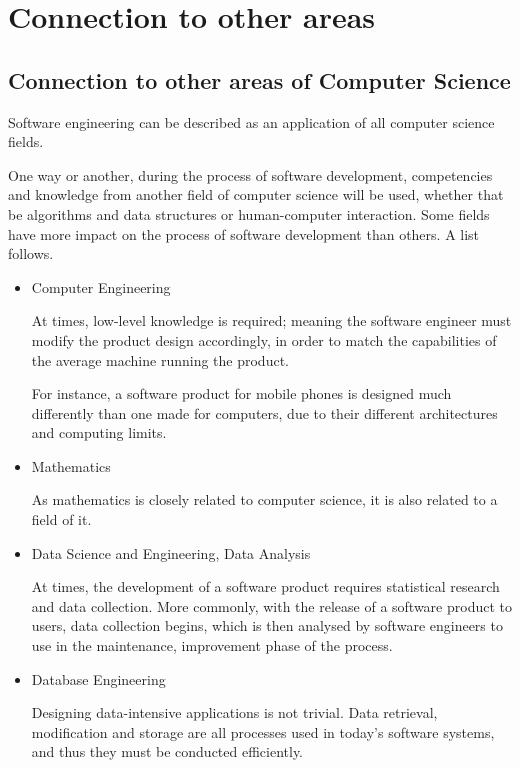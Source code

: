 \documentclass[a4paper]{article}
\begin{document}
    \newpage
    \section{Connection to other areas}
        \subsection*{Connection to other areas of Computer Science}

            Software engineering can be described as an application of all computer science fields. 
            
            One way or another, during the process of software development, competencies and knowledge from another field of computer science will be used, whether that be algorithms and data structures or human-computer interaction. Some fields have more impact on the process of software development than others. A list follows.

            \begin{itemize}
                \item Computer Engineering
                
                    At times, low-level knowledge is required; meaning the software engineer must modify the product design accordingly, in order to match the capabilities of the average machine running the product.

                    For instance, a software product for mobile phones is designed much differently than one made for computers, due to their different architectures and computing limits.
                    
                \item Mathematics
                
                    As mathematics is closely related to computer science, it is also related to a field of it.

                \item Data Science and Engineering, Data Analysis
                
                    At times, the development of a software product requires statistical research and data collection. More commonly, with the release of a software product to users, data collection begins, which is then analysed by software engineers to use in the maintenance, improvement phase of the process.
                
                \item Database Engineering
                
                    Designing data-intensive applications is not trivial. Data retrieval, modification and storage are all processes used in today's software systems, and thus they must be conducted efficiently.
                
            \end{itemize}
\end{document}
